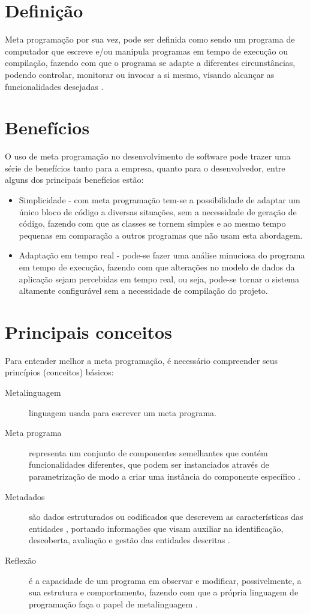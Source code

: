 \documentclass[tc,oneside]{iiufrgs}
\begin{document}
\section{Definição}

Meta programação por sua vez, pode ser definida como sendo um programa de computador que escreve e/ou manipula programas em tempo de execução ou compilação, fazendo com que o programa se adapte a diferentes circunstâncias, podendo controlar, monitorar ou invocar a si mesmo, visando alcançar as funcionalidades desejadas \cite{hazzard2013metaprogramming}.
\section{Benefícios}
O uso de meta programação no desenvolvimento de software pode trazer uma série de benefícios tanto para a empresa, quanto para o desenvolvedor, entre alguns dos principais benefícios estão:

\begin{itemize}
\item Simplicidade - com meta programação tem-se a possibilidade de adaptar um único bloco de código a diversas situações, sem a necessidade de geração de código, fazendo com que as classes se tornem simples e ao mesmo tempo pequenas em comparação a outros programas que não usam esta abordagem.
\item Adaptação em tempo real - pode-se fazer uma análise minuciosa do programa em tempo de execução, fazendo com que alterações no modelo de dados da aplicação sejam percebidas em tempo real, ou seja, pode-se tornar o sistema altamente configurável sem a necessidade de compilação do projeto.
\end{itemize}

\section{Principais conceitos}
Para entender melhor a meta programação, é necessário compreender seus princípios (conceitos) básicos:

\begin{description}
\item [Metalinguagem]  linguagem usada para escrever um meta programa.
\item [Meta programa ] representa um conjunto de componentes semelhantes que contém funcionalidades diferentes, que podem ser instanciados através de parametrização de modo a criar uma instância do componente específico \cite{damavsevivcius2008taxonomy}.
\item [Metadados] são dados estruturados ou codificados que descrevem as características das entidades , portando informações que visam auxiliar na identificação,  descoberta, avaliação e gestão das entidades descritas \cite{american1999task}.
\item [Reflexão] é a capacidade de um programa em observar e modificar, possivelmente, a sua estrutura e comportamento, fazendo com que a própria linguagem de programação faça o papel de metalinguagem \cite{malenfant1996tutorial}.
\end{description}
\end{document}
